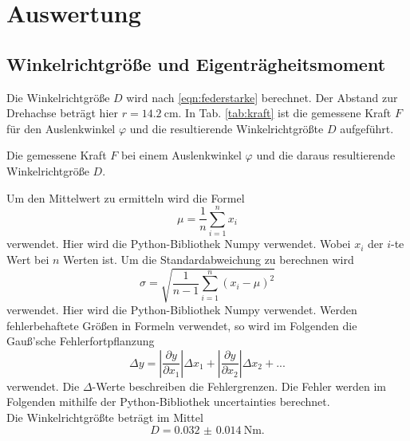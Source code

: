 \section{Auswertung}
\label{sec:Auswertung}
\subsection{Winkelrichtgröße und Eigenträgheitsmoment}
Die Winkelrichtgröße $D$ wird nach \eqref{eqn:federstarke}
berechnet.
Der Abstand zur Drehachse beträgt hier $r=\SI{14.2}{\centi\metre}$.
In Tab. \ref{tab:kraft} ist die gemessene Kraft $F$ für den Auslenkwinkel $\varphi$ und die resultierende Winkelrichtgrößte $D$ aufgeführt.
\begin{table}
    \centering
    \caption{Die gemessene Kraft $F$ bei einem Auslenkwinkel $\varphi$ und die daraus resultierende Winkelrichtgröße $D$.}
    \label{tab:kraft}  
\end{table}
\FloatBarrier
Um den Mittelwert zu ermitteln wird die Formel
\begin{equation}
    \mu = \frac{1}{n} \sum_{i=1}^n x_i
\end{equation}
verwendet. Hier wird die Python-Bibliothek Numpy \cite{numpy} verwendet.
Wobei $x_i$ der $i$-te Wert bei $n$ Werten ist.
Um die Standardabweichung zu berechnen wird
\begin{equation}
    \sigma = \sqrt{\frac{1}{n-1} \sum_{i=1}^n (x_i - \mu)^2}
\end{equation}
verwendet. Hier wird die Python-Bibliothek Numpy \cite{numpy} verwendet.
Werden fehlerbehaftete Größen in Formeln verwendet, so wird im Folgenden die Gauß'sche Fehlerfortpflanzung 
\begin{equation}
    \Delta y = \left|\frac{\partial y}{\partial x_1}\right| \Delta x_1 + \left|\frac{\partial y}{\partial x_2}\right| \Delta x_2 + ...
\end{equation}
verwendet. Die $\Delta$-Werte beschreiben die Fehlergrenzen.
Die Fehler werden im Folgenden mithilfe der Python-Bibliothek uncertainties \cite{uncertainties} berechnet.
\\
Die Winkelrichtgrößte beträgt im Mittel
\begin{equation*}
    D = \SI{0.032(14)}{\newton\metre} .
\end{equation*}
